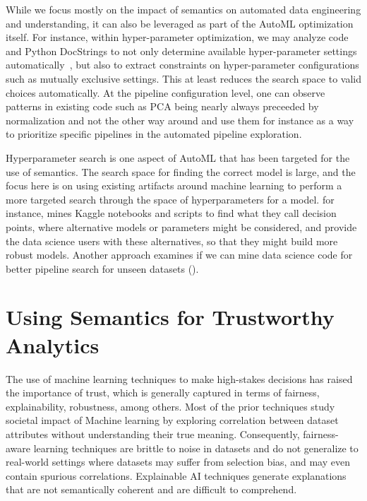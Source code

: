 \documentclass[sigconf]{acmart}
\begin{document}
While we focus mostly on the impact of semantics on automated data engineering and understanding, it can also be leveraged as part of the AutoML optimization itself. For instance, within hyper-parameter optimization, we may analyze code and Python DocStrings to not only determine available hyper-parameter settings automatically~\cite{hpodoc}, but also to extract constraints on hyper-parameter configurations such as mutually exclusive settings. This at least reduces the search space to valid choices automatically. %
At the pipeline configuration level, one can observe patterns in existing code such as PCA being nearly always preceeded by normalization and not the other way around and use them for instance as a way to prioritize specific pipelines in the automated pipeline exploration.

Hyperparameter search is one aspect of AutoML that has been targeted for the use of semantics.  The search space for finding the correct model is large, and the focus here is on using existing artifacts around machine learning to perform a more targeted search through the space of hyperparameters for a model.  \cite{10.1145/3447548.3467455} for instance, mines Kaggle notebooks and scripts to find what they call decision points, where alternative models or parameters might be considered, and provide the data science users with these alternatives, so that they might build more robust models.  
Another approach examines if we can mine data science code for better pipeline search for unseen datasets (\cite{KGPIP}).


\section{Using Semantics for Trustworthy Analytics }%
\label{trustworthy_section}
The use of machine learning techniques to make high-stakes decisions has raised the importance of trust, which is generally captured in terms of fairness, explainability, robustness, among others. Most of the prior techniques study societal impact of Machine learning by exploring correlation between dataset attributes without understanding their true meaning. 
Consequently, fairness-aware learning techniques are brittle to noise in datasets and do not generalize to real-world settings where datasets may suffer from selection bias, and may even contain spurious correlations. Explainable AI techniques generate explanations that are not semantically coherent and are difficult to comprehend. 
\end{document}

